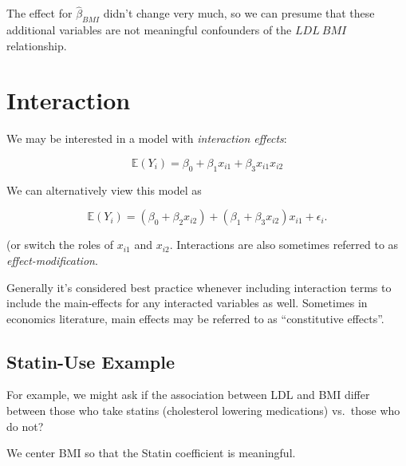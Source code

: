 \documentclass[
  letterpaper,
  DIV=11,
  numbers=noendperiod]{scrreport}
\newenvironment{Shaded}{\begin{snugshade}}{\end{snugshade}}
\newcommand{\AttributeTok}[1]{\textcolor[rgb]{0.40,0.45,0.13}{#1}}
\newcommand{\ConstantTok}[1]{\textcolor[rgb]{0.56,0.35,0.01}{#1}}
\newcommand{\FunctionTok}[1]{\textcolor[rgb]{0.28,0.35,0.67}{#1}}
\newcommand{\NormalTok}[1]{\textcolor[rgb]{0.00,0.23,0.31}{#1}}
\newcommand{\OtherTok}[1]{\textcolor[rgb]{0.00,0.23,0.31}{#1}}
\newcommand{\SpecialCharTok}[1]{\textcolor[rgb]{0.37,0.37,0.37}{#1}}
\begin{document}
The effect for \(\hat \beta_{BMI}\) didn't change very much, so we can
presume that these additional variables are not meaningful confounders
of the \(LDL ~ BMI\) relationship.

\hypertarget{interaction}{%
\section{Interaction}\label{interaction}}

We may be interested in a model with \emph{interaction effects}:

\[ \mathbb E(Y_i) = \beta_0 + \beta_1 x_{i1} + \beta_3 x_{i1} x_{i2}\]

We can alternatively view this model as

\[ \mathbb E(Y_i) = (\beta_0 + \beta_2 x_{i2}) + (\beta_1 + \beta_3 x_{i2})x_{i1} + \epsilon_i.\]

(or switch the roles of \(x_{i1}\) and \(x_{i2}\). Interactions are also
sometimes referred to as \emph{effect-modification}.

Generally it's considered best practice whenever including interaction
terms to include the main-effects for any interacted variables as well.
Sometimes in economics literature, main effects may be referred to as
``constitutive effects''.

\hypertarget{statin-use-example}{%
\subsection{Statin-Use Example}\label{statin-use-example}}

For example, we might ask if the association between LDL and BMI differ
between those who take statins (cholesterol lowering medications)
vs.~those who do not?

We center BMI so that the Statin coefficient is meaningful.

\begin{Shaded}
\end{Shaded}
\end{document}
